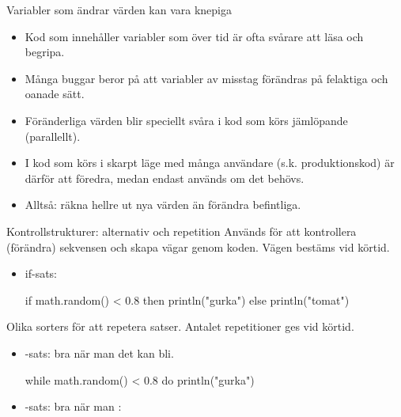\begin{Slide}{Variabler som ändrar värden kan vara knepiga}
\begin{itemize}
\item Kod som innehåller variabler som  över tid är ofta svårare att läsa och begripa.

\item Många buggar beror på att variabler av misstag förändras på felaktiga och oanade sätt.

\item Föränderliga värden blir speciellt svåra i kod som körs jämlöpande (parallellt).

\item I kod som körs i skarpt läge med många användare (s.k. produktionskod) är därför  att föredra, medan  endast används om det  behövs.
\item Alltså: räkna hellre ut nya värden än förändra befintliga.
\end{itemize}
\end{Slide}



\begin{Slide}{Kontrollstrukturer: alternativ och repetition}\SlideFontSmall
Används för att kontrollera (förändra) sekvensen och skapa  vägar genom koden. Vägen  bestäms vid körtid.
\begin{itemize}
\item if-sats:
\begin{Code}
if math.random() < 0.8 then println("gurka") else println("tomat")
\end{Code}
\end{itemize}

Olika sorters  för att repetera satser. Antalet repetitioner ges vid körtid.
\begin{itemize}
\item {}-sats: bra när man  det kan bli.
\begin{Code}
while math.random() < 0.8 do println("gurka")
\end{Code}

\item {}-sats: bra när man :

\end{itemize}
\end{Slide}

